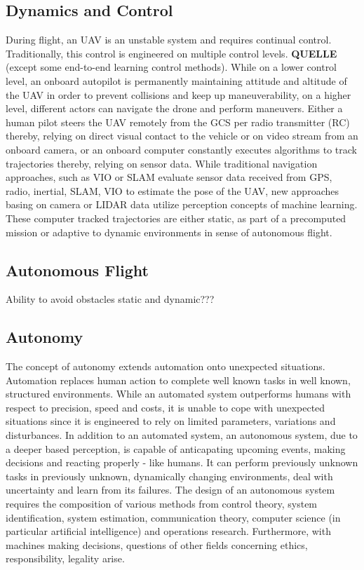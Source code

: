 \subsection{Dynamics and Control}

During flight, an UAV is an unstable system
and requires continual control.
Traditionally, this control is
engineered on multiple control levels.
\textbf{QUELLE}
(except some end-to-end learning control methods).
While on a lower control level,
an onboard autopilot is 
permanently maintaining attitude and altitude of the UAV
in order to prevent 
collisions and keep up maneuverability,
on a higher level, different actors 
can navigate the drone and perform maneuvers.
Either a human pilot steers the UAV remotely from
the GCS per radio transmitter (RC)
thereby, relying on direct visual contact to the vehicle 
or on video stream from an onboard camera,
or an onboard computer constantly executes 
algorithms to track trajectories
thereby, relying on sensor data.
While traditional navigation approaches,
such as VIO or SLAM
evaluate sensor data received from
GPS, radio, inertial, SLAM, VIO
to estimate the pose of the UAV,
new approaches basing
on camera or LIDAR data utilize perception concepts
of machine learning.
These computer tracked trajectories 
are either static,
as part of a
precomputed mission or 
adaptive to dynamic environments
in sense of autonomous flight.


\subsection{Autonomous Flight}

Ability to avoid obstacles
static and dynamic???





\subsection{Autonomy}
The concept of autonomy extends
automation 
onto unexpected situations. 
Automation replaces human action
to complete well known tasks in well known, structured environments.
While an automated system outperforms humans
with respect to 
precision, speed and costs,
it is unable to
cope with unexpected situations
since it is engineered to rely on limited
parameters, variations and disturbances.
In addition to an automated system,
an autonomous system, 
due to a deeper based perception,
is capable of anticapating upcoming events,
making decisions and reacting properly - like humans.
It can perform previously unknown tasks
in previously unknown, dynamically changing environments,
deal with uncertainty and learn from its failures.
The design of an autonomous system
requires the composition of
various methods from 
control theory,
system identification, 
system estimation,
communication theory,
computer science (in particular artificial intelligence)
and
operations research.
Furthermore, with machines making decisions,
questions of other fields concerning
ethics,
responsibility,
legality
arise.


